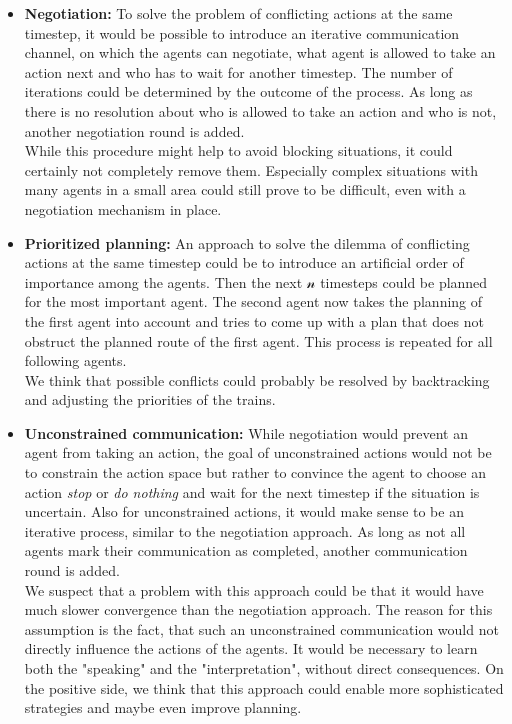 \begin{itemize}
	\item \textbf{Negotiation:} To solve the problem of conflicting actions at the same timestep, it would be possible to introduce an iterative communication channel, on which the agents can negotiate, what agent is allowed to take an action next and who has to wait for another timestep. The number of iterations could be determined by the outcome of the process. As long as there is no resolution about who is allowed to take an action and who is not, another negotiation round is added.\\
	While this procedure might help to avoid blocking situations, it could certainly not completely remove them. Especially complex situations with many agents in a small area could still prove to be difficult, even with a negotiation mechanism in place.

	\item \textbf{Prioritized planning:} An approach to solve the dilemma of conflicting actions at the same timestep could be to introduce an artificial order of importance among the agents. Then the next $\mathcal{n}$ timesteps could be planned for the most important agent. The second agent now takes the planning of the first agent into account and tries to come up with a plan that does not obstruct the planned route of the first agent. This process is repeated for all following agents.\\
	We think that possible conflicts could probably be resolved by backtracking and adjusting the priorities of the trains.

	\item \textbf{Unconstrained communication:} While negotiation would prevent an agent from taking an action, the goal of unconstrained actions would not be to constrain the action space but rather to convince the agent to choose an action \textit{stop} or \textit{do nothing} and wait for the next timestep if the situation is uncertain. Also for unconstrained actions, it would make sense to be an iterative process, similar to the negotiation approach. As long as not all agents mark their communication as completed, another communication round is added.\\
	We suspect that a problem with this approach could be that it would have much slower convergence than the negotiation approach. The reason for this assumption is the fact, that such an unconstrained communication would not directly influence the actions of the agents. It would be necessary to learn both the "speaking" and the "interpretation", without direct consequences. On the positive side, we think that this approach could enable more sophisticated strategies and maybe even improve planning.


\end{itemize}
